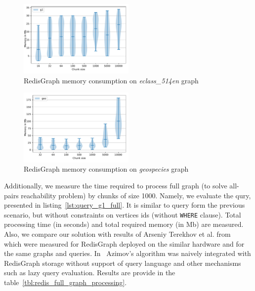 \begin{figure}[h]
\centering
\includegraphics[width=0.5\textwidth]{data/raw_memory/eclass_514en.pdf}
\caption{RedisGraph memory consumption on \textit{eclass\_514en} graph}
\label{fig:redis_memory_eclass}
\end{figure}

\begin{figure}[h]
\centering
\includegraphics[width=0.5\textwidth]{data/raw_memory/geospecies.pdf}
\caption{RedisGraph memory consumption on \textit{geospecies} graph}
\label{fig:redis_memory_geospecies}
\end{figure}


\begin{algorithm}
\end{algorithm}


Additionally, we measure the time required to process full graph (to solve all-pairs reachability problem) by chunks of size 1000.
Namely, we evaluate the qury, presented in listing~\ref{lst:query_g1_full}. 
It is similar to query form the previous scenario, but without constraints on vertices ids (without \texttt{WHERE} clause).
Total processing time (in seconds) and total required memory (in Mb) are measured.
Also, we compare our solution with results of Arseniy Terekhov et al. from~\cite{10.1145/3398682.3399163} which were measured for RedisGraph deployed on the similar hardware and for the same graphs and queries.
In~\cite{10.1145/3398682.3399163} Azimov's algorithm was naively integrated with RedisGraph storage without support of query language and other mechanisms such as lazy query evaluation.
Results are provide in the table~\ref{tbl:redis_full_graph_processing}.


